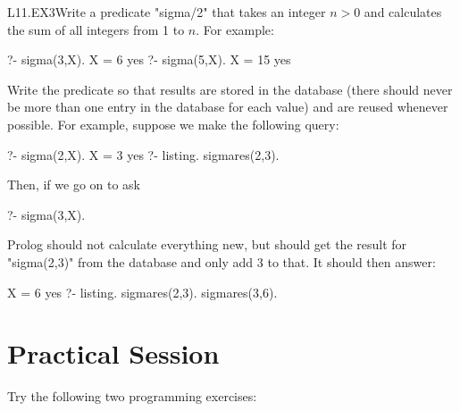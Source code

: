 \begin{LPNexercise}{L11.EX3}Write a predicate "sigma/2" that takes an integer $n >
0$ and calculates the sum of all integers from 1 to
$n$. For example:

\begin{LPNcodedisplay}
?- sigma(3,X).
X = 6
yes
?- sigma(5,X).
X = 15
yes
\end{LPNcodedisplay}

Write the predicate so that results are stored in the database
(there should never be  more than one  entry in the database
for each value) and are reused whenever possible. For example,
suppose we make the following query:
\begin{LPNcodedisplay}
?- sigma(2,X).
X = 3
yes
?- listing.
sigmares(2,3).
\end{LPNcodedisplay}
Then, if we go on to ask
\begin{LPNcodedisplay}
?- sigma(3,X).
\end{LPNcodedisplay}
Prolog should not calculate everything new, but should get the result for
"sigma(2,3)" from the database and only add 3 to that. It should then answer:
\begin{LPNcodedisplay}
X = 6
yes
?- listing.
sigmares(2,3).
sigmares(3,6).
\end{LPNcodedisplay}
\end{LPNexercise}


\section{Practical Session}\label{SEC.L11.PRAXIS}

Try the following two programming exercises:

